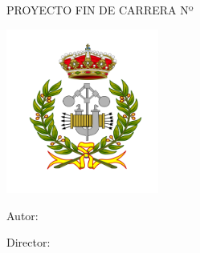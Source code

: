 \documentclass[twoside,openright,12pt]{report}
\begin{document}
\begin{titlepage}
\begin{center}
\fontsize{17pt}{19pt}
{\selectfont
PROYECTO FIN DE CARRERA Nº \makenumero \\
\bigskip
\bigskip
\bigskip
\maketitulo}

\vspace{\fill}

\noindent\begin{minipage}{0.42\textwidth}
\quad\includegraphics[width=5cm]{etsii_02} %
\end{minipage}
\begin{minipage}{0.55\textwidth}
  \begin{flushleft}
\fontsize{15pt}{15pt}
{\selectfont
 Autor:\\[-.2mm]
\makeautor

\bigskip
Director:\\[-.2mm]
\makedirector

\bigskip
\makefecha
}
  \end{flushleft}
\end{minipage}
\end{center}
\end{titlepage}
\end{document}
